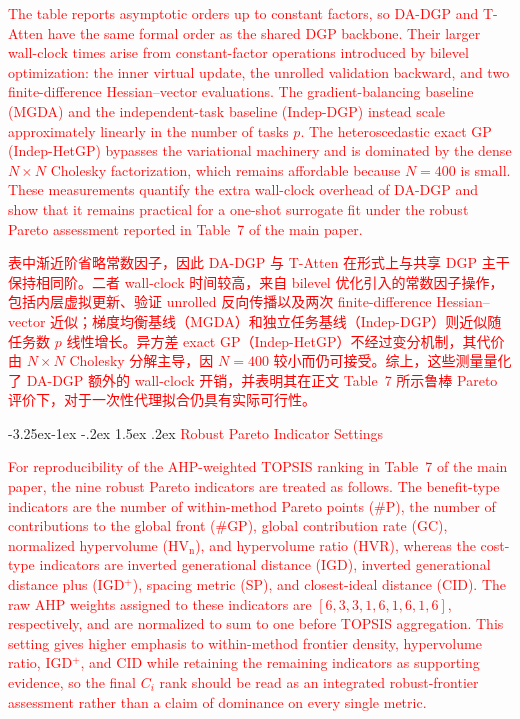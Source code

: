 \documentclass[11pt]{article}
\makeatletter
\renewcommand\subsection{\@startsection{subsection}{2}{\z@}%
	{-3.25ex\@plus -1ex \@minus -.2ex}%
	{1.5ex \@plus .2ex}%
	{\normalfont\fontfamily{phv}\fontsize{14}{17}\bfseries}}
\makeatother
\begin{document}
		\textcolor{red}{The table reports asymptotic orders up to constant factors, so DA-DGP and T-Atten have the same formal order as the shared DGP backbone. Their larger wall-clock times arise from constant-factor operations introduced by bilevel optimization: the inner virtual update, the unrolled validation backward, and two finite-difference Hessian--vector evaluations. The gradient-balancing baseline (MGDA) and the independent-task baseline (Indep-DGP) instead scale approximately linearly in the number of tasks $p$. The heteroscedastic exact GP (Indep-HetGP) bypasses the variational machinery and is dominated by the dense $N\times N$ Cholesky factorization, which remains affordable because $N=400$ is small. These measurements quantify the extra wall-clock overhead of DA-DGP and show that it remains practical for a one-shot surrogate fit under the robust Pareto assessment reported in Table~7 of the main paper.}%

		\textcolor{red}{表中渐近阶省略常数因子，因此 DA-DGP 与 T-Atten 在形式上与共享 DGP 主干保持相同阶。二者 wall-clock 时间较高，来自 bilevel 优化引入的常数因子操作，包括内层虚拟更新、验证 unrolled 反向传播以及两次 finite-difference Hessian--vector 近似；梯度均衡基线（MGDA）和独立任务基线（Indep-DGP）则近似随任务数 $p$ 线性增长。异方差 exact GP（Indep-HetGP）不经过变分机制，其代价由 $N\times N$ Cholesky 分解主导，因 $N=400$ 较小而仍可接受。综上，这些测量量化了 DA-DGP 额外的 wall-clock 开销，并表明其在正文 Table~7 所示鲁棒 Pareto 评价下，对于一次性代理拟合仍具有实际可行性。}%

	\subsection{\textcolor{red}{Robust Pareto Indicator Settings}} \label{app:F1}%

		\textcolor{red}{For reproducibility of the AHP-weighted TOPSIS ranking in Table~7 of the main paper, the nine robust Pareto indicators are treated as follows. The benefit-type indicators are the number of within-method Pareto points (\#P), the number of contributions to the global front (\#GP), global contribution rate (GC), normalized hypervolume ($\mathrm{HV}_{\mathrm{n}}$), and hypervolume ratio (HVR), whereas the cost-type indicators are inverted generational distance (IGD), inverted generational distance plus (IGD$^{+}$), spacing metric (SP), and closest-ideal distance (CID). The raw AHP weights assigned to these indicators are $[6,3,3,1,6,1,6,1,6]$, respectively, and are normalized to sum to one before TOPSIS aggregation. This setting gives higher emphasis to within-method frontier density, hypervolume ratio, IGD$^{+}$, and CID while retaining the remaining indicators as supporting evidence, so the final $C_i$ rank should be read as an integrated robust-frontier assessment rather than a claim of dominance on every single metric.}%
\end{document}

